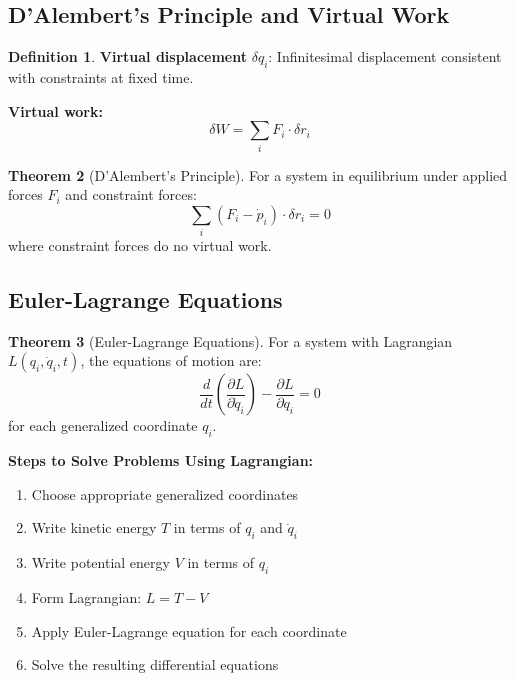 \documentclass[12pt,a4paper]{article}
\theoremstyle{definition}
\newtheorem{theorem}{Theorem}[section]
\newtheorem{definition}[theorem]{Definition}
\begin{document}
\subsection{D'Alembert's Principle and Virtual Work}

\begin{definition}
\textbf{Virtual displacement} $\delta q_i$: Infinitesimal displacement consistent with constraints at fixed time.

\textbf{Virtual work:}
\[
\delta W = \sum_i F_i \cdot \delta r_i
\]
\end{definition}

\begin{theorem}[D'Alembert's Principle]
For a system in equilibrium under applied forces $F_i$ and constraint forces:
\[
\sum_i (F_i - \dot{p}_i) \cdot \delta r_i = 0
\]
where constraint forces do no virtual work.
\end{theorem}

\subsection{Euler-Lagrange Equations}

\begin{theorem}[Euler-Lagrange Equations]
For a system with Lagrangian $L(q_i, \dot{q}_i, t)$, the equations of motion are:
\[
\frac{d}{dt}\left(\frac{\partial L}{\partial \dot{q}_i}\right) - \frac{\partial L}{\partial q_i} = 0
\]
for each generalized coordinate $q_i$.
\end{theorem}

\begin{importantbox}
\textbf{Steps to Solve Problems Using Lagrangian:}
\begin{enumerate}
    \item Choose appropriate generalized coordinates
    \item Write kinetic energy $T$ in terms of $q_i$ and $\dot{q}_i$
    \item Write potential energy $V$ in terms of $q_i$
    \item Form Lagrangian: $L = T - V$
    \item Apply Euler-Lagrange equation for each coordinate
    \item Solve the resulting differential equations
\end{enumerate}
\end{importantbox}
\end{document}
